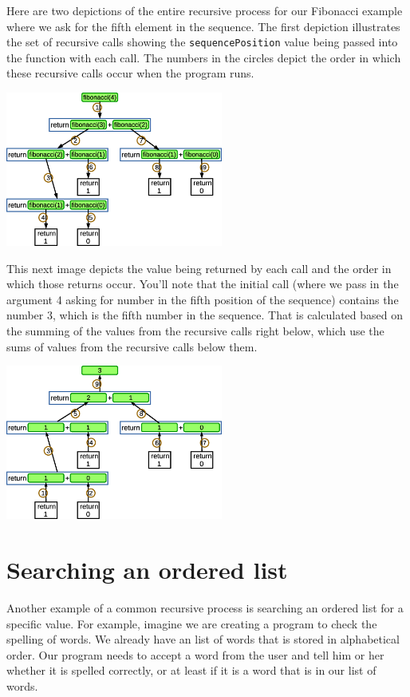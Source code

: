 \pagebreak

Here are two depictions of the entire recursive process for our Fibonacci example where we ask for the fifth element in the sequence. The first depiction illustrates the set of recursive calls showing the \texttt{sequencePosition} value being passed into the function with each call. The numbers in the circles depict the order in which these recursive calls occur when the program runs.

\beforefig
\centerline{\includegraphics[height=2in]{figs2/recursion-fibonacci-depiction-0.eps}}
\afterfig

This next image depicts the value being returned by each call and the order in which those returns occur. You'll note that the initial call (where we pass in the argument 4 asking for number in the fifth position of the sequence) contains the number 3, which is the fifth number in the sequence. That is calculated based on the summing of the values from the recursive calls right below, which use the sums of values from the recursive calls below them.

\beforefig
\centerline{\includegraphics[height=2in]{figs2/recursion-fibonacci-depiction-1.eps}}
\afterfig

\section{Searching an ordered list}

Another example of a common recursive process is searching an ordered list for a specific value. For example, imagine we are creating a program to check the spelling of words. We already have an list of words that is stored in alphabetical order. Our program needs to accept a word from the user and tell him or her whether it is spelled correctly, or at least if it is a word that is in our list of words.


